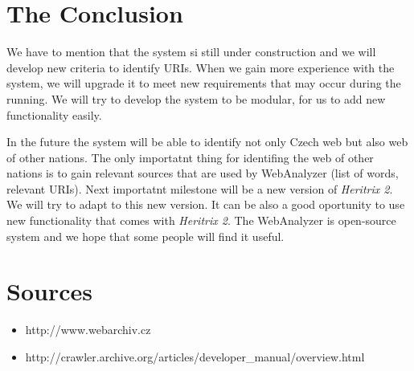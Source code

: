 \documentclass[11pt,a4paper]{article}
\begin{document}

\newpage
\section{The Conclusion}

We have to mention that the system si still under construction and we will develop new criteria to identify URIs. When we gain more experience with the system, we will upgrade it to meet new requirements that may occur during the running. We will try to develop the system to be modular, for us to add new functionality easily. 

In the future the system will be able to identify not only Czech web but also web of other nations. The only importatnt thing for identifing the web of other nations is to gain relevant sources that are used by WebAnalyzer (list of words, relevant URIs). Next importatnt milestone will be a new version of \emph{Heritrix 2}. We will try to adapt to this new version. It can be also a good oportunity to use new functionality that comes with \emph{Heritrix 2}. The WebAnalyzer is open-source system and we hope that some people will find it useful.


\newpage
\section{Sources}

\begin{itemize}
\item http://www.webarchiv.cz
\item http://crawler.archive.org/articles/developer\_manual/overview.html
\end{itemize}
\end{document}
